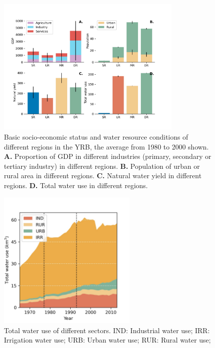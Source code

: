 \documentclass[9pt,twoside,lineno]{pnas-new}
\begin{document}
\begin{figure}
    \centering
    \includegraphics[width=0.8\textwidth]{../../figures/sup/region_differences.jpg}
    \caption{
        Basic socio-economic status and water resource conditions of different regions in the YRB, the average from 1980 to 2000 shown.
        \textbf{A.} Proportion of GDP in different industries (primary, secondary or tertiary industry) in different regions.
        \textbf{B.} Population of urban or rural area in different regions.
        \textbf{C.} Natural water yield in different regions.
        \textbf{D.} Total water use in different regions.
    }
\end{figure}

\begin{figure}
    \centering
    \includegraphics[width=0.6\textwidth]{../../figures/sup/sf_wu_sections_stackplot.jpg}
    \caption{
        Total water use of different sectors.
        IND: Industrial water use;
        IRR: Irrigation water use;
        URB: Urban water use;
        RUR: Rural water use;
    }
\end{figure}
\end{document}
